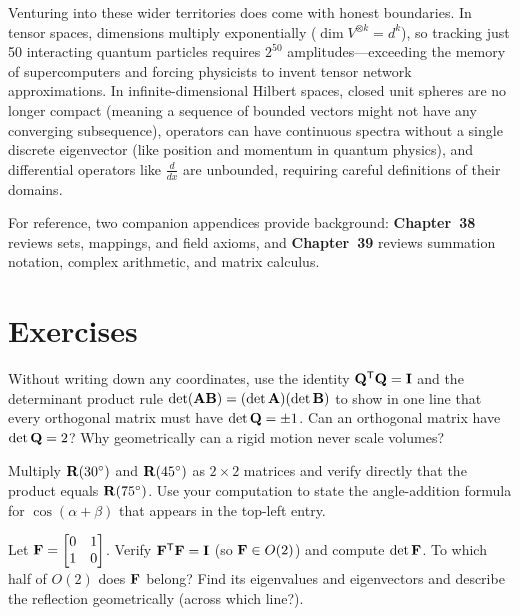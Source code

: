 Venturing into these wider territories does come with honest boundaries. In tensor
spaces, dimensions multiply exponentially ($\dim V^{\otimes k} = d^k$), so tracking
just 50 interacting quantum particles requires $2^{50}$ amplitudes---exceeding the
memory of supercomputers and forcing physicists to invent tensor network approximations.
In infinite-dimensional Hilbert spaces, closed unit spheres are no longer compact (meaning a sequence of bounded vectors might not have any converging subsequence),
operators can have continuous spectra without a single discrete eigenvector (like
position and momentum in quantum physics), and differential operators like
$\frac{d}{dx}$ are unbounded, requiring careful definitions of their domains.

For reference, two companion appendices provide background: \textbf{Chapter~38}
reviews sets, mappings, and field axioms, and \textbf{Chapter~39} reviews summation
notation, complex arithmetic, and matrix calculus.

\section*{Exercises}

\begin{exercise}
\label{ch37:ex-mental-det}
Without writing down any coordinates, use the identity $\mathbf{Q}^{\mathsf{T}}\mathbf{Q} = \mathbf{I}$ and
the determinant product rule $\det(\mathbf{A}\mathbf{B}) = (\det\mathbf{A})(\det\mathbf{B})$ to
show in one line that every orthogonal matrix must have $\det\mathbf{Q} = \pm 1$.
Can an orthogonal matrix have $\det\mathbf{Q} = 2$? Why geometrically can a rigid motion
never scale volumes?
\end{exercise}

\begin{exercise}
\label{ch37:ex-so2}
Multiply $\mathbf{R}(30^\circ)$ and $\mathbf{R}(45^\circ)$ as $2\times 2$ matrices and
verify directly that the product equals $\mathbf{R}(75^\circ)$. Use your computation to
state the angle-addition formula for $\cos(\alpha+\beta)$ that appears in the
top-left entry.
\end{exercise}

\begin{exercise}
\label{ch37:ex-reflection}
Let $\mathbf{F}=\begin{bmatrix}0&1\\1&0\end{bmatrix}$. Verify $\mathbf{F}^{\mathsf{T}}\mathbf{F}=\mathbf{I}$
(so $\mathbf{F}\in O(2)$) and compute $\det\mathbf{F}$. To which half of $O(2)$ does
$\mathbf{F}$ belong? Find its eigenvalues and eigenvectors and describe the reflection
geometrically (across which line?).
\end{exercise}

